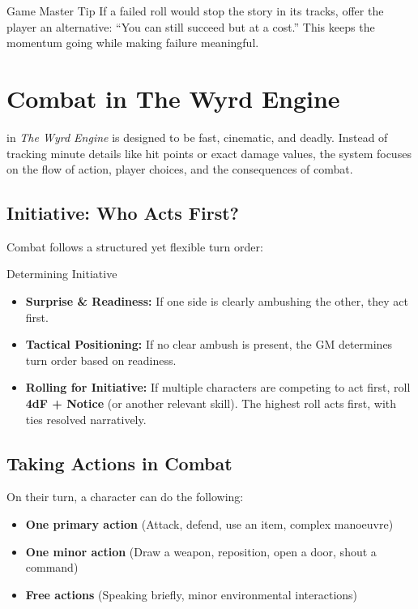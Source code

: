 \begin{DndComment}{Game Master Tip}
    If a failed roll would stop the story in its tracks, offer the player an alternative: “You can still succeed but at a cost.” This keeps the momentum going while making failure meaningful.
\end{DndComment}


\section{Combat in The Wyrd Engine}

 in \textit{The Wyrd Engine} is designed to be fast, cinematic, and deadly. Instead of tracking minute details like hit points or exact damage values, the system focuses on the flow of action, player choices, and the consequences of combat.

\subsection{Initiative: Who Acts First?}
Combat follows a structured yet flexible turn order:

\begin{DndReadAloud}{Determining Initiative}
\begin{itemize}
    \item \textbf{Surprise \& Readiness:} If one side is clearly ambushing the other, they act first.
    \item \textbf{Tactical Positioning:} If no clear ambush is present, the GM determines turn order based on readiness.
    \item \textbf{Rolling for Initiative:} If multiple characters are competing to act first, roll \textbf{4dF + Notice} (or another relevant skill). The highest roll acts first, with ties resolved narratively.
\end{itemize}
\end{DndReadAloud}

\subsection{Taking Actions in Combat}
On their turn, a character can do the following:
\begin{itemize}
    \item \textbf{One primary action} (Attack, defend, use an item, complex manoeuvre)
    \item \textbf{One minor action} (Draw a weapon, reposition, open a door, shout a command)
    \item \textbf{Free actions} (Speaking briefly, minor environmental interactions)
\end{itemize}

